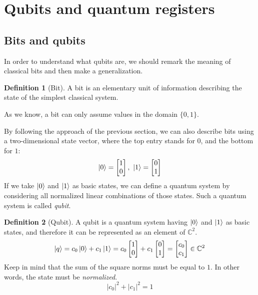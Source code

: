 \documentclass[12pt,a4paper]{report}
\theoremstyle{definition}
\newtheorem{definition}{Definition}[section]
\theoremstyle{definition}
\theoremstyle{definition}
\begin{document}
\section{Qubits and quantum registers}
\subsection{Bits and qubits}
In order to understand what qubits are, we should remark the meaning of classical bits and then make a generalization.
\begin{definition}[Bit]
A bit is an elementary unit of information describing the state of the simplest classical system.
\end{definition}
As we know, a bit can only assume values in the domain $\{0,1\}$.
\begin{center}
\end{center}
By following the approach of the previous section, we can also describe bits using a two-dimensional state vector, where the top entry stands for $0$, and the bottom for $1$:
\begin{equation*}
    \ket{0}=\begin{bmatrix}
        1\\
        0
    \end{bmatrix},\ 
    \ket{1}=\begin{bmatrix}
        0\\
        1
    \end{bmatrix}
\end{equation*}
If we take $\ket{0}$ and $\ket{1}$ as basic states, we can define a quantum system by considering all normalized linear combinations of those states. Such a quantum system is called \textit{qubit}.
\begin{definition}[Qubit]
A qubit is a quantum system having $\ket{0}$ and $\ket{1}$ as basic states, and therefore it can be represented as an element of $\mathbb{C}^2$.
\begin{equation*}
    \ket{q}=c_0\ket{0}+c_1\ket{1}=c_0\begin{bmatrix}
        1\\
        0
    \end{bmatrix}+c_1\begin{bmatrix}
        0\\
        1
    \end{bmatrix}=\begin{bmatrix}
        c_0\\
        c_1
    \end{bmatrix} \in \mathbb{C}^2
\end{equation*}
Keep in mind that the sum of the square norms must be equal to $1$. In other words, the state must be \textit{normalized}.
\begin{equation*}
    \left|c_0\right|^2+\left|c_1\right|^2=1
\end{equation*}
\end{definition}
\end{document}
